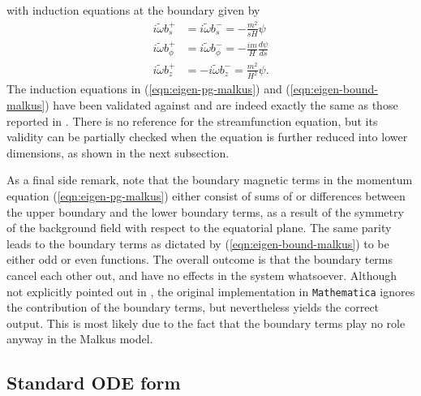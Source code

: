 with induction equations at the boundary given by
\begin{equation}\label{eqn:eigen-bound-malkus}
    \begin{aligned}
        i \widetilde{\omega} b^{+}_{s} &= i \widetilde{\omega} b^{-}_{s} = - \frac{m^{2}}{s H} \psi\\
        i \widetilde{\omega} b^{+}_{\phi} &= i \widetilde{\omega} b^{-}_{\phi} = - \frac{i m}{H} \frac{d \psi}{d s}\\
        i \widetilde{\omega} b^{+}_{z} &= -i \widetilde{\omega} b^{-}_{z} = \frac{m^{2}}{H^{2}} \psi.
    \end{aligned}
\end{equation}
The induction equations in (\ref{eqn:eigen-pg-malkus}) and (\ref{eqn:eigen-bound-malkus}) have been validated against and are indeed exactly the same as those reported in \textcite{holdenried-chernoff_long_2021}.
There is no reference for the streamfunction equation, but its validity can be partially checked when the equation is further reduced into lower dimensions, as shown in the next subsection.

As a final side remark, note that the boundary magnetic terms in the momentum equation (\ref{eqn:eigen-pg-malkus}) either consist of sums of or differences between the upper boundary and the lower boundary terms, as a result of the symmetry of the background field with respect to the equatorial plane.
The same parity leads to the boundary terms as dictated by (\ref{eqn:eigen-bound-malkus}) to be either odd or even functions.
The overall outcome is that the boundary terms cancel each other out, and have no effects in the system whatsoever.
Although not explicitly pointed out in \textcite{holdenried-chernoff_long_2021}, the original implementation in \texttt{Mathematica} ignores the contribution of the boundary terms, but nevertheless yields the correct output. This is most likely due to the fact that the boundary terms play no role anyway in the Malkus model.

\subsection{Standard ODE form}

